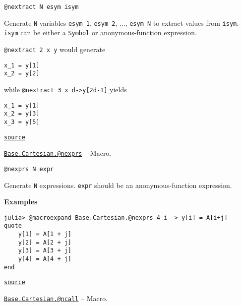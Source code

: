 \begin{adjustwidth}{2em}{0pt}


\begin{verbatim}
@nextract N esym isym
\end{verbatim}

Generate \texttt{N} variables \texttt{esym\_1}, \texttt{esym\_2}, ..., \texttt{esym\_N} to extract values from \texttt{isym}. \texttt{isym} can be either a \texttt{Symbol} or anonymous-function expression.

\texttt{@nextract 2 x y} would generate


\begin{lstlisting}
x_1 = y[1]
x_2 = y[2]
\end{lstlisting}

while \texttt{@nextract 3 x d->y[2d-1]} yields


\begin{lstlisting}
x_1 = y[1]
x_2 = y[3]
x_3 = y[5]
\end{lstlisting}



\href{https://github.com/JuliaLang/julia/blob/2d472c633d66e7697dda5aff75d2367b823048b8/base/cartesian.jl#L132-L149}{\texttt{source}}


\end{adjustwidth}
\hypertarget{17386123129446980507}{}
\hyperlink{17386123129446980507}{\texttt{Base.Cartesian.@nexprs}}  -- {Macro.}

\begin{adjustwidth}{2em}{0pt}


\begin{verbatim}
@nexprs N expr
\end{verbatim}

Generate \texttt{N} expressions. \texttt{expr} should be an anonymous-function expression.

\textbf{Examples}


\begin{verbatim}
julia> @macroexpand Base.Cartesian.@nexprs 4 i -> y[i] = A[i+j]
quote
    y[1] = A[1 + j]
    y[2] = A[2 + j]
    y[3] = A[3 + j]
    y[4] = A[4 + j]
end
\end{verbatim}



\href{https://github.com/JuliaLang/julia/blob/2d472c633d66e7697dda5aff75d2367b823048b8/base/cartesian.jl#L111-L126}{\texttt{source}}


\end{adjustwidth}
\hypertarget{16431416314224139891}{}
\hyperlink{16431416314224139891}{\texttt{Base.Cartesian.@ncall}}  -- {Macro.}

